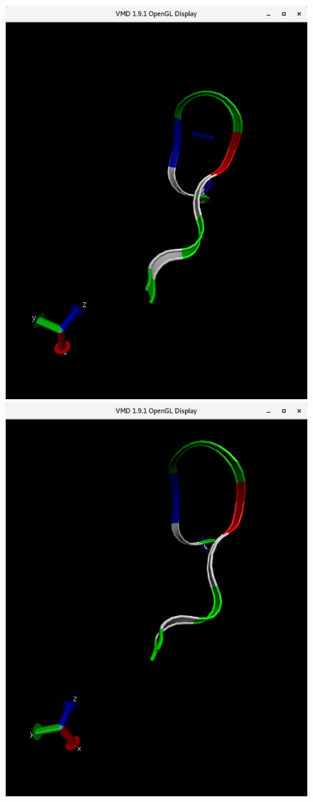 \documentclass[12pt, onecolumn]{revtex4}    %
\begin{document}
\begin{figure}[h!]
\includegraphics[scale=0.2]{HB}
\includegraphics[scale=0.2]{NoHB}

\end{figure}
\end{document}
